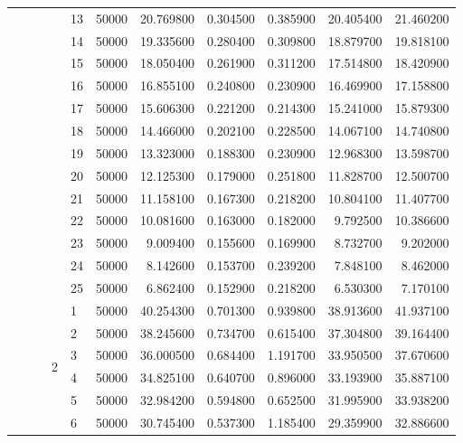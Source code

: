 \begin{tabular}{llllllrrrrr}
\cline{5-11}
 &  &  &  & 13 & 50000 & 20.769800 & 0.304500 & 0.385900 & 20.405400 & 21.460200 \\
\cline{5-11}
 &  &  &  & 14 & 50000 & 19.335600 & 0.280400 & 0.309800 & 18.879700 & 19.818100 \\
\cline{5-11}
 &  &  &  & 15 & 50000 & 18.050400 & 0.261900 & 0.311200 & 17.514800 & 18.420900 \\
\cline{5-11}
 &  &  &  & 16 & 50000 & 16.855100 & 0.240800 & 0.230900 & 16.469900 & 17.158800 \\
\cline{5-11}
 &  &  &  & 17 & 50000 & 15.606300 & 0.221200 & 0.214300 & 15.241000 & 15.879300 \\
\cline{5-11}
 &  &  &  & 18 & 50000 & 14.466000 & 0.202100 & 0.228500 & 14.067100 & 14.740800 \\
\cline{5-11}
 &  &  &  & 19 & 50000 & 13.323000 & 0.188300 & 0.230900 & 12.968300 & 13.598700 \\
\cline{5-11}
 &  &  &  & 20 & 50000 & 12.125300 & 0.179000 & 0.251800 & 11.828700 & 12.500700 \\
\cline{5-11}
 &  &  &  & 21 & 50000 & 11.158100 & 0.167300 & 0.218200 & 10.804100 & 11.407700 \\
\cline{5-11}
 &  &  &  & 22 & 50000 & 10.081600 & 0.163000 & 0.182000 & 9.792500 & 10.386600 \\
\cline{5-11}
 &  &  &  & 23 & 50000 & 9.009400 & 0.155600 & 0.169900 & 8.732700 & 9.202000 \\
\cline{5-11}
 &  &  &  & 24 & 50000 & 8.142600 & 0.153700 & 0.239200 & 7.848100 & 8.462000 \\
\cline{5-11}
 &  &  &  & 25 & 50000 & 6.862400 & 0.152900 & 0.218200 & 6.530300 & 7.170100 \\
\cline{4-11} \cline{5-11}
 &  &  & \multirow[t]{25}{*}{2} & 1 & 50000 & 40.254300 & 0.701300 & 0.939800 & 38.913600 & 41.937100 \\
\cline{5-11}
 &  &  &  & 2 & 50000 & 38.245600 & 0.734700 & 0.615400 & 37.304800 & 39.164400 \\
\cline{5-11}
 &  &  &  & 3 & 50000 & 36.000500 & 0.684400 & 1.191700 & 33.950500 & 37.670600 \\
\cline{5-11}
 &  &  &  & 4 & 50000 & 34.825100 & 0.640700 & 0.896000 & 33.193900 & 35.887100 \\
\cline{5-11}
 &  &  &  & 5 & 50000 & 32.984200 & 0.594800 & 0.652500 & 31.995900 & 33.938200 \\
\cline{5-11}
 &  &  &  & 6 & 50000 & 30.745400 & 0.537300 & 1.185400 & 29.359900 & 32.886600 \\

\end{tabular}

